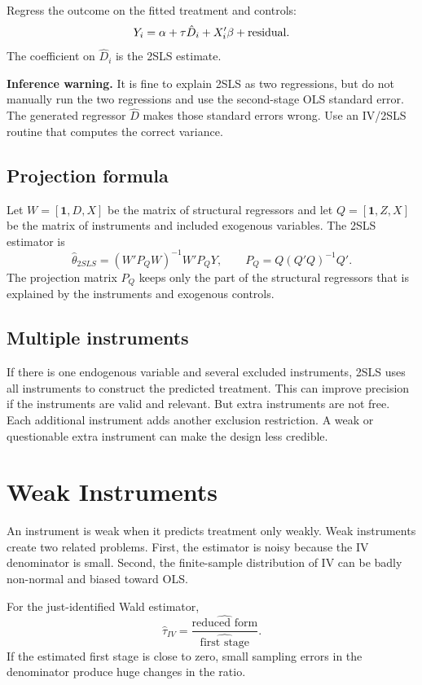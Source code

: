 Regress the outcome on the fitted treatment and controls:
\[
    Y_i = \alpha + \tau \hat{D}_i + X_i'\beta + \text{residual}.
\]
The coefficient on $\hat{D}_i$ is the 2SLS estimate.

\begin{boxF}
\textbf{Inference warning.} It is fine to explain 2SLS as two regressions, but
do not manually run the two regressions and use the second-stage OLS standard
error. The generated regressor $\hat{D}$ makes those standard errors wrong.
Use an IV/2SLS routine that computes the correct variance.
\end{boxF}

\subsection{Projection formula}

Let $W=[\mathbf{1},D,X]$ be the matrix of structural regressors and let
$Q=[\mathbf{1},Z,X]$ be the matrix of instruments and included exogenous
variables. The 2SLS estimator is
\[
    \hat{\theta}_{2SLS}
    =
    (W'P_Q W)^{-1} W'P_Q Y,
    \qquad
    P_Q = Q(Q'Q)^{-1}Q'.
\]
The projection matrix $P_Q$ keeps only the part of the structural regressors
that is explained by the instruments and exogenous controls.

\subsection{Multiple instruments}

If there is one endogenous variable and several excluded instruments, 2SLS uses
all instruments to construct the predicted treatment. This can improve
precision if the instruments are valid and relevant. But extra instruments are
not free. Each additional instrument adds another exclusion restriction. A weak
or questionable extra instrument can make the design less credible.

\section{Weak Instruments}

An instrument is weak when it predicts treatment only weakly. Weak instruments
create two related problems. First, the estimator is noisy because the IV
denominator is small. Second, the finite-sample distribution of IV can be badly
non-normal and biased toward OLS.

For the just-identified Wald estimator,
\[
    \hat{\tau}_{IV}
    =
    \frac{\widehat{\text{reduced form}}}
         {\widehat{\text{first stage}}}.
\]
If the estimated first stage is close to zero, small sampling errors in the
denominator produce huge changes in the ratio.

